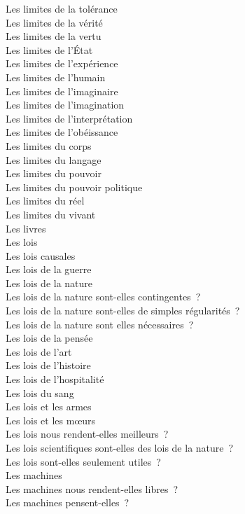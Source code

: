 \documentclass[a4paper,12pt]{article}
\begin{document}
Les limites de la tolérance \\
Les limites de la vérité \\
Les limites de la vertu \\
Les limites de l'État \\
Les limites de l'expérience \\
Les limites de l'humain \\
Les limites de l'imaginaire \\
Les limites de l'imagination \\
Les limites de l'interprétation \\
Les limites de l'obéissance \\
Les limites du corps \\
Les limites du langage \\
Les limites du pouvoir \\
Les limites du pouvoir politique \\
Les limites du réel \\
Les limites du vivant \\
Les livres \\
Les lois \\
Les lois causales \\
Les lois de la guerre \\
Les lois de la nature \\
Les lois de la nature sont-elles contingentes ? \\
Les lois de la nature sont-elles de simples régularités ? \\
Les lois de la nature sont elles nécessaires ? \\
Les lois de la pensée \\
Les lois de l'art \\
Les lois de l'histoire \\
Les lois de l'hospitalité \\
Les lois du sang \\
Les lois et les armes \\
Les lois et les mœurs \\
Les lois nous rendent-elles meilleurs ? \\
Les lois scientifiques sont-elles des lois de la nature ? \\
Les lois sont-elles seulement utiles ? \\
Les machines \\
Les machines nous rendent-elles libres ? \\
Les machines pensent-elles ? \\
\end{document}
